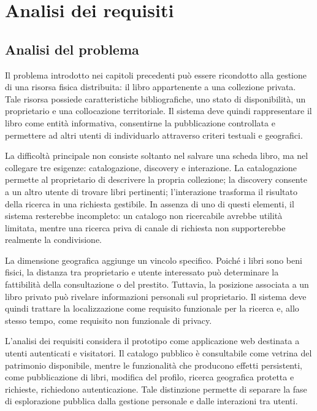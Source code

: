\chapter{Analisi dei requisiti}
\label{chap:requisiti}

\section{Analisi del problema}
\label{sec:analisi-problema}

Il problema introdotto nei capitoli precedenti può essere ricondotto alla gestione di una risorsa fisica distribuita: il libro appartenente a una collezione privata. Tale risorsa possiede caratteristiche bibliografiche, uno stato di disponibilità, un proprietario e una collocazione territoriale. Il sistema deve quindi rappresentare il libro come entità informativa, consentirne la pubblicazione controllata e permettere ad altri utenti di individuarlo attraverso criteri testuali e geografici.

La difficoltà principale non consiste soltanto nel salvare una scheda libro, ma nel collegare tre esigenze: catalogazione, discovery e interazione. La catalogazione permette al proprietario di descrivere la propria collezione; la discovery consente a un altro utente di trovare libri pertinenti; l'interazione trasforma il risultato della ricerca in una richiesta gestibile. In assenza di uno di questi elementi, il sistema resterebbe incompleto: un catalogo non ricercabile avrebbe utilità limitata, mentre una ricerca priva di canale di richiesta non supporterebbe realmente la condivisione.

La dimensione geografica aggiunge un vincolo specifico. Poiché i libri sono beni fisici, la distanza tra proprietario e utente interessato può determinare la fattibilità della consultazione o del prestito. Tuttavia, la posizione associata a un libro privato può rivelare informazioni personali sul proprietario. Il sistema deve quindi trattare la localizzazione come requisito funzionale per la ricerca e, allo stesso tempo, come requisito non funzionale di privacy.

L'analisi dei requisiti considera il prototipo come applicazione web destinata a utenti autenticati e visitatori. Il catalogo pubblico è consultabile come vetrina del patrimonio disponibile, mentre le funzionalità che producono effetti persistenti, come pubblicazione di libri, modifica del profilo, ricerca geografica protetta e richieste, richiedono autenticazione. Tale distinzione permette di separare la fase di esplorazione pubblica dalla gestione personale e dalle interazioni tra utenti.

